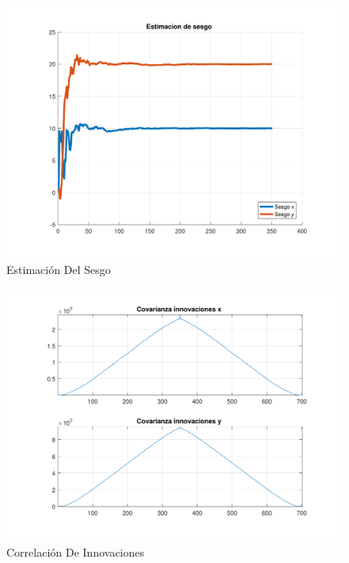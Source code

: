 	\begin{figure}[H]
		\centering
		\includegraphics[width=1.0\textwidth,keepaspectratio]{Figuras/bias_ej4d.pdf}
		\caption{Estimación Del Sesgo}
		\label{fig:ej4d_bias}
	\end{figure}
	
	\begin{figure}[H]
		\centering
		\includegraphics[width=1.0\textwidth,keepaspectratio]{Figuras/covinn_ej4d.pdf}
		\caption{Correlación De Innovaciones}
		\label{fig:ej4d_cov}
	\end{figure}


